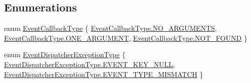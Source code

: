 \subsection*{Enumerations}
\begin{DoxyCompactItemize}
\item 
enum \hyperlink{namespacestrange_1_1extensions_1_1dispatcher_1_1eventdispatcher_1_1api_a7135cff6e8e84b74fb1aee88c8f5af4c}{Event\-Callback\-Type} \{ \hyperlink{namespacestrange_1_1extensions_1_1dispatcher_1_1eventdispatcher_1_1api_a7135cff6e8e84b74fb1aee88c8f5af4caff382d535c95d1d8c1376594d1bcd9a2}{Event\-Callback\-Type.\-N\-O\-\_\-\-A\-R\-G\-U\-M\-E\-N\-T\-S}, 
\hyperlink{namespacestrange_1_1extensions_1_1dispatcher_1_1eventdispatcher_1_1api_a7135cff6e8e84b74fb1aee88c8f5af4ca6843284a1a144b2248243fe8201b60a9}{Event\-Callback\-Type.\-O\-N\-E\-\_\-\-A\-R\-G\-U\-M\-E\-N\-T}, 
\hyperlink{namespacestrange_1_1extensions_1_1dispatcher_1_1eventdispatcher_1_1api_a7135cff6e8e84b74fb1aee88c8f5af4ca8c02547a8a3b02382bac3557bcb2280d}{Event\-Callback\-Type.\-N\-O\-T\-\_\-\-F\-O\-U\-N\-D}
 \}
\item 
enum \hyperlink{namespacestrange_1_1extensions_1_1dispatcher_1_1eventdispatcher_1_1api_ac82e4192fcc43ba5e64f0469a3c7c06d}{Event\-Dispatcher\-Exception\-Type} \{ \hyperlink{namespacestrange_1_1extensions_1_1dispatcher_1_1eventdispatcher_1_1api_ac82e4192fcc43ba5e64f0469a3c7c06da167e65bbf0cf6aa45533050ccb2511d6}{Event\-Dispatcher\-Exception\-Type.\-E\-V\-E\-N\-T\-\_\-\-K\-E\-Y\-\_\-\-N\-U\-L\-L}, 
\hyperlink{namespacestrange_1_1extensions_1_1dispatcher_1_1eventdispatcher_1_1api_ac82e4192fcc43ba5e64f0469a3c7c06da5ff62c887d3c7f1707f7033db01438fa}{Event\-Dispatcher\-Exception\-Type.\-E\-V\-E\-N\-T\-\_\-\-T\-Y\-P\-E\-\_\-\-M\-I\-S\-M\-A\-T\-C\-H}
 \}
\end{DoxyCompactItemize}
